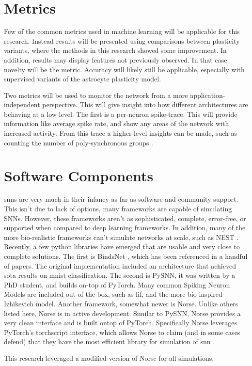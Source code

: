     \section{Metrics} \label{section:metrics}
    Few of the common metrics used in machine learning will be applicable for
    this research. Instead results will be presented using comparisons between
    plasticity variants, where the methods in this research showed some
    improvement. In addition, results may display features not previously
    observed. In that case novelty will be the metric. Accuracy will likely
    still be applicable, especially with supervised variants of the astrocyte
    plasticity model.
    
    Two metrics will be used to monitor the network from a more
    application-independent perspective. This will give insight into how
    different architectures are behaving at a low level. The first is a
    per-neuron spike-trace. This will provide information like average spike
    rate, and show any areas of the network with increased activity. From this
    trace a higher-level insights can be made, such as counting the number of
    poly-synchronous groups \parencite{gaetano_2013}.
    
    \section{Software Components}
    \Glspl{snn} are very much in their infancy as far as software and community
    support. This isn't due to lack of options, many frameworks are capable of
    simulating SNNs. However, these frameworks aren't as sophisticated,
    complete, error-free, or supported when compared to deep learning
    frameworks. In addition, many of the more bio-realistic frameworks can't
    simulate networks at scale, such as NEST \parencite{nest}. Recently, a few
    python libraries have emerged that are usable and very close to complete
    solutions. The first is BindsNet \parencite{bindsnet}, which has been
    referenced in a handful of papers. The original implementation included an
    architecture that achieved \acrshort{sota} results on \gls{mnist}
    classification. The second is PySNN, it was written by a PhD student, and
    builds on-top of PyTorch. Many common Spiking Neuron Models are included out
    of the box, such as \gls{lif}, and the more bio-inspired Izhikevich
    model. Another framework, somewhat newer is Norse. Unlike others listed
    here, Norse is in active development. Similar to PySNN, Norse provides a
    very clean interface and is built ontop of PyTorch. Specifically Norse
    leverages PyTorch's torchscript interface, which allows Norse to claim (and
    in some cases defend) that they have the most efficient library for
    simulation of \gls{snn} \parencite{norse2021}.

    This research leveraged a modified version of Norse for all simulations.
    
